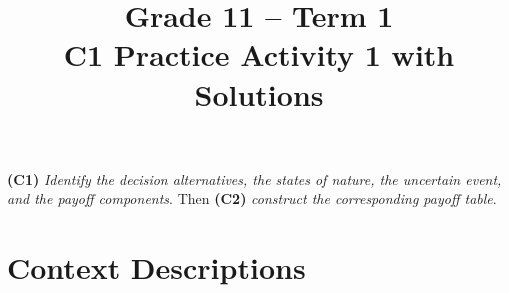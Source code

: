\makeatletter
{}
\makeatother







\title{Grade 11 -- Term 1 \\ C1 Practice Activity 1 with Solutions}
\author{}
\date{}

\pagestyle{empty}

\geometry{
	margin=0.3in,
	bottom=0.3in
}





	\vspace{-8mm}	
	\textbf{(C1)} \textit{Identify the decision alternatives, the states of nature, the uncertain event, and the payoff components}. Then \textbf{(C2)} \textit{construct the corresponding payoff table}. \vspace{-7mm}
	
	\section*{Context Descriptions}
	\vspace{-3mm}
	
